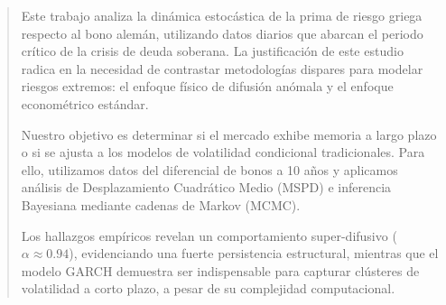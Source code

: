 \begin{abstract}
Este trabajo analiza la dinámica estocástica de la prima de riesgo griega respecto al bono alemán, utilizando datos diarios que abarcan el periodo crítico de la crisis de deuda soberana. La justificación de este estudio radica en la necesidad de contrastar metodologías dispares para modelar riesgos extremos: el enfoque físico de difusión anómala y el enfoque econométrico estándar. 

Nuestro objetivo es determinar si el mercado exhibe memoria a largo plazo o si se ajusta a los modelos de volatilidad condicional tradicionales. Para ello, utilizamos datos del diferencial de bonos a 10 años y aplicamos análisis de Desplazamiento Cuadrático Medio (MSPD) e inferencia Bayesiana mediante cadenas de Markov (MCMC). 

Los hallazgos empíricos revelan un comportamiento super-difusivo ($\alpha \approx 0.94$), evidenciando una fuerte persistencia estructural, mientras que el modelo GARCH demuestra ser indispensable para capturar clústeres de volatilidad a corto plazo, a pesar de su complejidad computacional.
\end{abstract}
